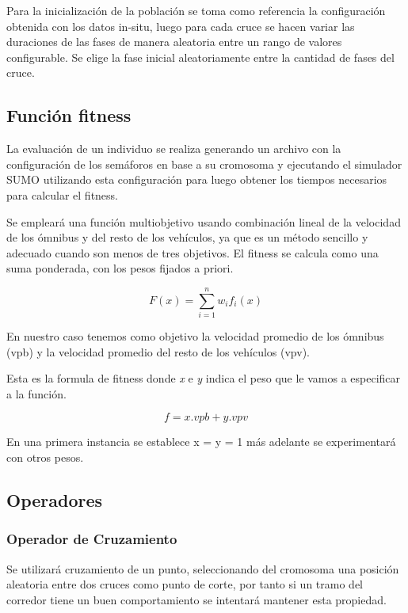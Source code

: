 Para la inicialización de la población se toma como referencia
la configuración obtenida con los datos in-situ, luego para cada
cruce se hacen variar las duraciones de las fases de manera aleatoria entre un rango de valores configurable. Se elige la fase inicial aleatoriamente entre la cantidad de fases del cruce.

\subsection{Función fitness}
La evaluación de un individuo se realiza generando un archivo con la configuración de los semáforos en base a su cromosoma y ejecutando el simulador SUMO utilizando esta configuración para luego obtener los tiempos necesarios para calcular el fitness.

Se empleará una función multiobjetivo usando combinación lineal de la velocidad de los ómnibus y del resto de los vehículos, ya que es un método sencillo y adecuado cuando son menos de tres objetivos. El fitness se calcula como una suma ponderada, con los pesos fijados a priori.

        \begin{equation}
        \label{eq:funcion_fitness_generica}
		F(x) = \sum_{i=1}^{n}{w_i}{f_i}(x)
        \end{equation}

En nuestro caso tenemos como objetivo la velocidad promedio de los ómnibus (vpb) y la velocidad promedio del resto de los vehículos (vpv).

Esta es la formula de fitness donde \emph{x} e \emph{y} indica el peso que le vamos a especificar a la función. 

        \begin{equation}
        \label{eq:funcion_fitness}
        f = x.vpb + y.vpv
        \end{equation}
        
En una primera instancia se establece x = y = 1 más adelante se experimentará con otros pesos.

\subsection{Operadores}
\subsubsection{Operador de Cruzamiento}
Se  utilizará cruzamiento de un punto, seleccionando del cromosoma una posición aleatoria entre dos cruces como punto de corte, por tanto si un tramo del corredor tiene un buen comportamiento se intentará mantener esta propiedad.

